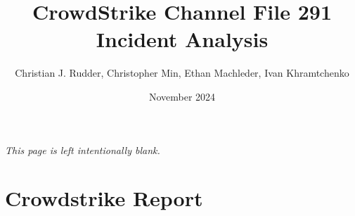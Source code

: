 \documentclass{memoir}
\title{CrowdStrike Channel File 291 Incident Analysis}
\author{Christian J. Rudder, Christopher Min, Ethan Machleder, Ivan Khramtchenko }
\date{November 2024}
\begin{document}
\maketitle
\setcounter{tocdepth}{2}

\tableofcontents

\newpage
\thispagestyle{empty}
\mbox{}
\vfill
\begin{center}
    \textit{This page is left intentionally blank.}
\end{center}
\vfill
\newpage
\thispagestyle{empty}




\chapter{Crowdstrike Report}




\end{document}
